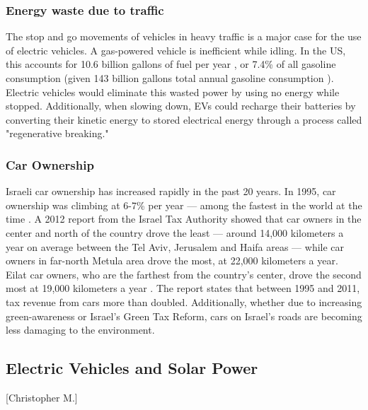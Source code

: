\documentclass{article}                         %
\begin{document}
\subsubsection{Energy waste due to traffic}
The stop and go movements of vehicles in heavy traffic is a major case for the use of electric vehicles. A gas-powered vehicle is inefficient while idling. In the US, this accounts for 10.6 billion gallons of fuel per year \cite{Carrico2009CostlyVehicles}, or 7.4\% of all gasoline consumption (given 143 billion gallons total annual gasoline consumption \cite{Administration2018HowConsume}). Electric vehicles would eliminate this wasted power by using no energy while stopped. Additionally, when slowing down, EVs could recharge their batteries by converting their kinetic energy to stored electrical energy through a process called "regenerative breaking."

\subsubsection{Car Ownership}
Israeli car ownership has increased rapidly in the past 20 years. In 1995, car ownership was climbing at 6-7\% per year --- among the fastest in the world at the time \cite{Slater1995IsraelCulture}. A 2012 report from the Israel Tax Authority showed that car owners in the center and north of the country drove the least --- around 14,000 kilometers a year on average between the Tel Aviv, Jerusalem and Haifa areas --- while car owners in far-north Metula area drove the most, at 22,000 kilometers a year. Eilat car owners, who are the farthest from the country’s center, drove the second most at 19,000 kilometers a year \cite{Schmil2012WhatHow}. The report states that between 1995 and 2011, tax revenue from cars more than doubled. Additionally, whether due to increasing green-awareness or Israel’s Green Tax Reform, cars on Israel's roads are becoming less damaging to the environment\cite{Schmil2012WhatHow}.

\subsection{Electric Vehicles and Solar Power}[Christopher M.]
\end{document}
